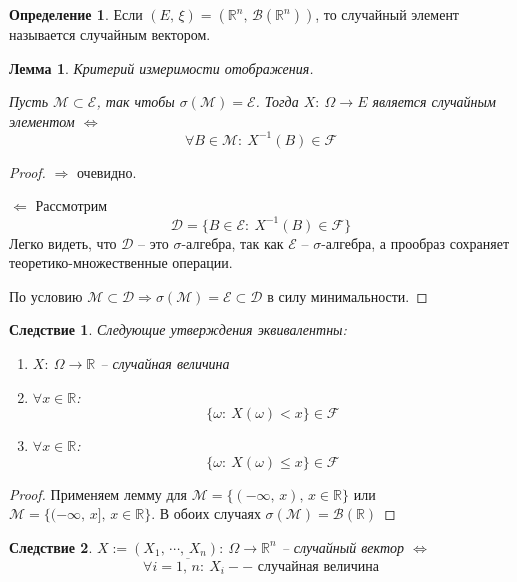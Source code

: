 \documentclass[a4paper,12pt]{article}
\renewcommand{\leq}{\ensuremath{\leqslant}}
\theoremstyle{plain}
\newtheorem{lemma}{Лемма}[section]
\newtheorem*{corollary}{Следствие}
\theoremstyle{definition}
\newtheorem{definition}{Определение}[section]
\theoremstyle{remark}
\begin{document}
\begin{definition}
	Если $(E,\,\xi) = (\mathbb{R}^n,\, \mathcal{B}(\mathbb{R}^n))$, то случайный элемент называется случайным вектором.
\end{definition}

\begin{lemma}
	Критерий измеримости отображения.

	Пусть $\mathcal{M} \subset \mathcal{E}$, так чтобы $\sigma(\mathcal{M}) = \mathcal{E}$.
	Тогда $X:\: \Omega \to E$ является случайным элементом $\Leftrightarrow$
	\[\forall B \in \mathcal{M}:\: X^{-1}(B) \in \mathcal{F}\]
\end{lemma}

\begin{proof}
	$\Rightarrow$ очевидно.

	$\Leftarrow$ Рассмотрим
	\[\mathcal{D} = \{B \in \mathcal{E}:\: X^{-1}(B) \in \mathcal{F}\}\]
	Легко видеть, что $\mathcal{D}$ -- это $\sigma$-алгебра, так как $\mathcal{E}$ -- $\sigma$-алгебра, а прообраз сохраняет теоретико-множественные операции.

	По условию $\mathcal{M} \subset \mathcal{D} \Rightarrow \sigma(\mathcal{M}) = \mathcal{E} \subset \mathcal{D}$ в силу минимальности.
\end{proof}

\begin{corollary}
	Следующие утверждения эквивалентны:
	\begin{enumerate}
		\item $X:\: \Omega \to \mathbb{R}$ -- случайная величина
		\item $\forall x \in \mathbb{R}$:
		      \[\{\omega:\: X(\omega) < x\} \in \mathcal{F}\]
		\item $\forall x \in \mathbb{R}$:
		      \[\{\omega:\: X(\omega) \leq x\} \in \mathcal{F}\]
	\end{enumerate}
\end{corollary}

\begin{proof}
	Применяем лемму для $\mathcal{M} = \{(-\infty,\,x),\, x \in \mathbb{R}\}$ или $\mathcal{M} = \{(-\infty,\,x],\, x \in \mathbb{R}\}$. В обоих случаях $\sigma(\mathcal{M}) = \mathcal{B}(\mathbb{R})$
\end{proof}

\begin{corollary}
	$X := (X_1,\,\cdots,\,X_n):\: \Omega \to \mathbb{R}^n$ -- случайный вектор $\Leftrightarrow$
	\[\forall i = \overline{1,\,n}:\: X_i -- \text{ случайная величина}\]
\end{corollary}
\end{document}
